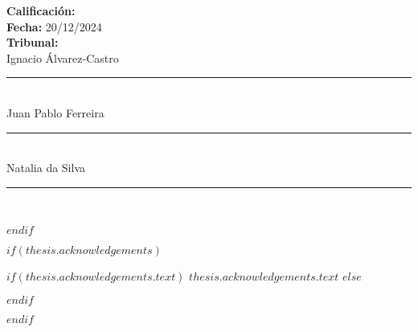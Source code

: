     \begin{flushleft}
    \textbf{Calificación:} \\
    \vspace{0.8cm}
    \textbf{Fecha:} 20/12/2024\\
    \vspace{1cm}
    \textbf{Tribunal:}\\
    \vspace{0.8cm}
    Ignacio Álvarez-Castro {\rule{0.5\textwidth}{.4pt}}\\
    \vspace{0.8cm}
    Juan Pablo Ferreira{\rule{0.5\textwidth}{.4pt}}\\
    \vspace{0.8cm}
    Natalia da Silva {\rule{0.5\textwidth}{.4pt}}\\

    \end{flushleft}

$endif$

$if(thesis.acknowledgements)$

\begin{acknowledgements}
\addchaptertocentry{\acknowledgementname} %
$if(thesis.acknowledgements.text)$
$thesis.acknowledgements.text$
$else$

$endif$
\end{acknowledgements}

$endif$


\begingroup
\hypersetup{linkcolor=$if(toclinkcolor)$$toclinkcolor$$else$black$endif$}






\renewcommand{\chaptername}{Capítulo}
\renewcommand{\tablename}{Tabla}
\renewcommand{\contentsname}{Índice}
\renewcommand{\listfigurename}{Lista de Figuras}
\renewcommand{\listtablename}{Lista de Tablas}



